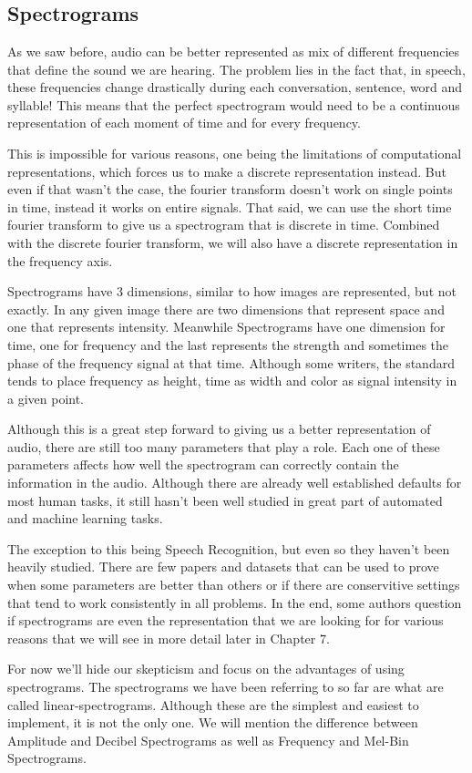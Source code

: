 \documentclass{book}
\begin{document}
\chapter{}
\section{Spectrograms}
\qquad As we saw before, audio can be better represented as mix of different frequencies that define the sound we are hearing. The problem lies in the fact that, in speech, these frequencies change drastically during each conversation, sentence, word and syllable! This means that the perfect spectrogram would need to be a continuous representation of each moment of time and for every frequency.
\par
This is impossible for various reasons, one being the limitations of computational representations, which forces us to make a discrete representation instead. But even if that wasn’t the case, the fourier transform doesn’t work on single points in time, instead it works on entire signals. That said, we can use the short time fourier transform to give us a spectrogram that is discrete in time. Combined with the discrete fourier transform, we will also have a discrete representation in the frequency axis.
\par
Spectrograms have 3 dimensions, similar to how images are represented, but not exactly. In any given image there are two dimensions that represent space and one that represents intensity. Meanwhile Spectrograms have one dimension for time, one for frequency and the last represents the strength and sometimes the phase of the frequency signal at that time. Although some writers, the standard tends to place frequency as height, time as width and color as signal intensity in a given point.
\par
Although this is a great step forward to giving us a better representation of audio, there are still too many parameters that play a role. Each one of these parameters affects how well the spectrogram can correctly contain the information in the audio. Although there are already well established defaults for most human tasks, it still hasn’t been well studied in great part of automated and machine learning tasks.
\par
The exception to this being Speech Recognition, but even so they haven’t been heavily studied. There are few papers and datasets that can be used to prove when some parameters are better than others or if there are conservitive settings that tend to work consistently in all problems. In the end, some authors question if spectrograms are even the representation that we are looking for for various reasons that we will see in more detail later in Chapter 7.
\par
For now we'll hide our skepticism and focus on the advantages of using spectrograms. The spectrograms we have been referring to so far are what are called linear-spectrograms. Although these are the simplest and easiest to implement, it is not the only one. We will mention the difference between Amplitude and Decibel Spectrograms as well as Frequency and Mel-Bin Spectrograms.
\end{document}
